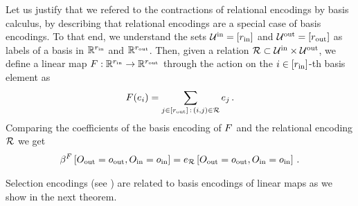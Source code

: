 \begin{example}
    Let us justify that we refered to the contractions of relational encodings by basis calculus, by describing that relational encodings are a special case of basis encodings.
    To that end, we understand the sets $\mathcal{U}^{\mathrm{in}}=[r_{\mathrm{in}}]$ and $\mathcal{U}^{\mathrm{out}}=[r_{\mathrm{out}}]$ as labels of a basis in $\mathbb{R}^{r_{\mathrm{in}}}$ and $\mathbb{R}^{r_{\mathrm{out}}}$.
    Then, given a relation $\mathcal{R} \subset \mathcal{U}^{\mathrm{in}} \times \mathcal{U}^{\mathrm{out}}$, we define a linear map $F : \mathbb{R}^{r_{\mathrm{in}}} \rightarrow \mathbb{R}^{r_{\mathrm{out}}}$ through the action on the $i\in[r_{\mathrm{in}}]$-th basis element as
    \begin{align*}
        F(e_{i}) = \sum_{j\in[r_{\mathrm{out}}]\, : \, (i,j) \in \mathcal{R}} e_{j} \, .
    \end{align*}
    Comparing the coefficients of the basis encoding of $F$ and the relational encoding $\mathcal{R}$ we get
    \begin{align*}
        \beta^{F}\left[O_{\mathrm{out}}=o_{\mathrm{out}},O_{\mathrm{in}}=o_{\mathrm{in}}\right]
        = e_{\mathcal{R}}\left[O_{\mathrm{out}}=o_{\mathrm{out}},O_{\mathrm{in}}=o_{\mathrm{in}}\right] \, .
    \end{align*}
\end{example}




Selection encodings (see ) are related to basis encodings of linear maps as we show in the next theorem.

